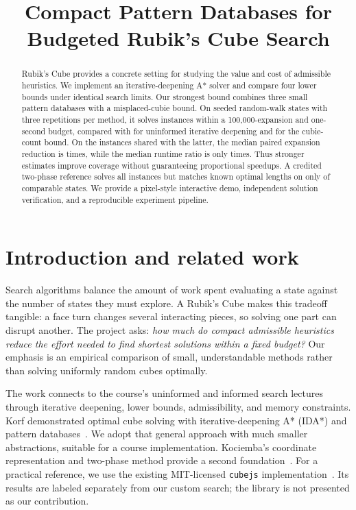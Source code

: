 \documentclass{article}
\title{Compact Pattern Databases for Budgeted Rubik's Cube Search}
\begin{document}
\maketitle

\begin{abstract}
Rubik's Cube provides a concrete setting for studying the value and cost of admissible heuristics. We implement an iterative-deepening A* solver and compare four lower bounds under identical search limits. Our strongest bound combines three small pattern databases with a misplaced-cubie bound. On \InstanceCount{} seeded random-walk states with three repetitions per method, it solves \HThreeSolved{} instances within a 100,000-expansion and one-second budget, compared with \HZeroSolved{} for uninformed iterative deepening and \HOneSolved{} for the cubie-count bound. On the \PairCount{} instances shared with the latter, the median paired expansion reduction is \PairNodeRatio{} times, while the median runtime ratio is only \PairTimeRatio{} times. Thus stronger estimates improve coverage without guaranteeing proportional speedups. A credited two-phase reference solves all instances but matches known optimal lengths on only \RefMatches{} of \RefKnown{} comparable states. We provide a pixel-style interactive demo, independent solution verification, and a reproducible experiment pipeline.
\end{abstract}

\section{Introduction and related work}
Search algorithms balance the amount of work spent evaluating a state against the number of states they must explore. A Rubik's Cube makes this tradeoff tangible: a face turn changes several interacting pieces, so solving one part can disrupt another. The project asks: \emph{how much do compact admissible heuristics reduce the effort needed to find shortest solutions within a fixed budget?} Our emphasis is an empirical comparison of small, understandable methods rather than solving uniformly random cubes optimally.

The work connects to the course's uninformed and informed search lectures through iterative deepening, lower bounds, admissibility, and memory constraints. Korf demonstrated optimal cube solving with iterative-deepening A* (IDA*) and pattern databases~\citep{korf}. We adopt that general approach with much smaller abstractions, suitable for a course implementation. Kociemba's coordinate representation and two-phase method provide a second foundation~\citep{coordinates,twophase}. For a practical reference, we use the existing MIT-licensed \texttt{cubejs} implementation~\citep{cubejs}. Its results are labeled separately from our custom search; the library is not presented as our contribution.
\end{document}
